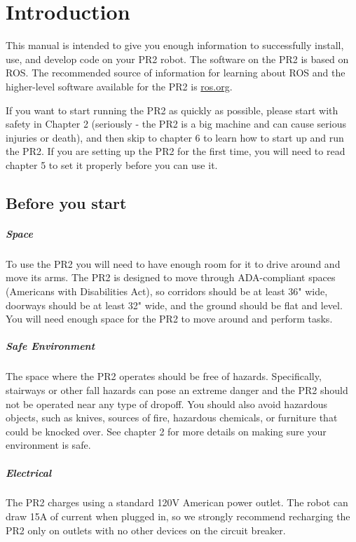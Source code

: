 \chapter {Introduction}
This manual is intended to give you enough information to successfully install, use, and develop code on your PR2 robot.  The software on the PR2 is based on ROS.  The recommended source of information for learning about ROS and the higher-level software available for the PR2 is \href{http://ros.org}{ros.org}.

If you want to start running the PR2 as quickly as possible, please start with safety in Chapter 2 (seriously - the PR2 is a big machine and can cause serious injuries or death), and then skip to chapter 6 to learn how to start up and run the PR2.  If you are setting up the PR2 for the first time, you will need to read chapter 5 to set it properly before you can use it.

\section{Before you start}
\paragraph{Space} To use the PR2 you will need to have enough room for it to drive around and move its arms.  The PR2 is designed to move through ADA-compliant spaces (Americans with Disabilities Act), so corridors should be at least 36" wide, doorways should be at least 32" wide, and the ground should be flat and level.  You will need enough space for the PR2 to move around and perform tasks.
\paragraph{Safe Environment} The space where the PR2 operates should be free of hazards.  Specifically, stairways or other fall hazards can pose an extreme danger and the PR2 should not be operated near any type of dropoff.  You should also avoid hazardous objects, such as knives, sources of fire, hazardous chemicals, or furniture that could be knocked over.  See chapter 2 for more details on making sure your environment is safe.
\paragraph{Electrical} The PR2 charges using a standard 120V American power outlet.  The robot can draw 15A of current when plugged in, so we strongly recommend recharging the PR2 only on outlets with no other devices on the circuit breaker.
